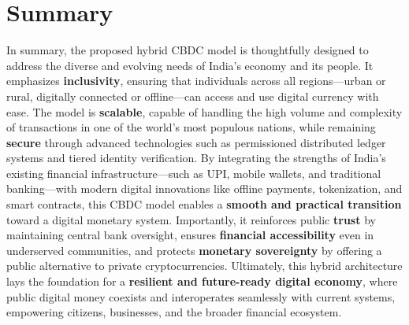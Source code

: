 \section{Summary}
In summary, the proposed hybrid CBDC model is thoughtfully designed to address the diverse and evolving needs of India's economy and its people. It emphasizes \textbf{inclusivity}, ensuring that individuals across all regions---urban or rural, digitally connected or offline---can access and use digital currency with ease. The model is \textbf{scalable}, capable of handling the high volume and complexity of transactions in one of the world's most populous nations, while remaining \textbf{secure} through advanced technologies such as permissioned distributed ledger systems and tiered identity verification.
By integrating the strengths of India’s existing financial infrastructure---such as UPI, mobile wallets, and traditional banking---with modern digital innovations like offline payments, tokenization, and smart contracts, this CBDC model enables a \textbf{smooth and practical transition} toward a digital monetary system. Importantly, it reinforces public \textbf{trust} by maintaining central bank oversight, ensures \textbf{financial accessibility} even in underserved communities, and protects \textbf{monetary sovereignty} by offering a public alternative to private cryptocurrencies.
Ultimately, this hybrid architecture lays the foundation for a \textbf{resilient and future-ready digital economy}, where public digital money coexists and interoperates seamlessly with current systems, empowering citizens, businesses, and the broader financial ecosystem.\\\\\\\\\\
\pagebreak
\cleardoublepage